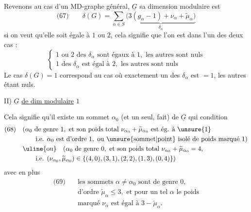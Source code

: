 Revenons au cas d'un MD-graphe général, $\underline G$ sa dimension modulaire est
\[
\text{(67)}\qquad\delta(G)=\sum_{\alpha\in S}\underbrace{\bigl(3(g_\alpha-1)+\nu_\alpha+\widetilde\mu_\alpha\bigr)}_{\delta_\alpha}
\]
si on veut qu'elle soit égale à $1$ ou $2$, cela signifie que l'on est dans l'un des deux cas :
\[
\left\{\begin{array}{l}
1\text{ ou }2\text{ des }\delta_\alpha\text{ sont égaux à }1,\text{ les autres sont nuls}\\
1\text{ des }\delta_\alpha\text{ est égal à }2,\text{ les autres sont nuls}
\end{array}\right.
\]
Le cas $\delta(G)=1$ correspond au cas où exactement un des $\delta_\alpha$ est $=1$, les autres étant nuls.

II) $\underline G$ \uline{de dim modulaire} $1$

Cela signifie qu'il existe un sommet $\alpha_0$ (et un seul,  fait) de $\underline G$ qui   condition
\[
\begin{aligned}
\text{(68)}\quad &(\alpha_0\text{ de genre }1,\text{ et son poids total }\nu_{\alpha_0}+\widetilde\mu_{\alpha_0}\text{ est ég. à }\unsure{1}\\
&\qquad\text{i.e. }\alpha_0\text{ est d'ordre }1,\text{ ou \unsure{sommet|point} isolé de poids marqué }1)\\
&\uline{\text{ou}}\quad(\alpha_0\text{ de genre }0,\text{ et son poids total }\nu_{\alpha_0}+\widetilde\mu_{\alpha_0}=4,\\
&\qquad\text{i.e. }(\nu_{\alpha_0},\widetilde\mu_{\alpha_0})\in\{(4,0),(3,1),(2,2),(1,3),(0,4)\})
\end{aligned}
\]
avec en plus
\[
\begin{aligned}
\text{(69)}\quad&\text{les sommets }\alpha\ne\alpha_0\text{ sont de genre }0,\\
&\text{d'ordre }\widetilde\mu_\alpha\leq3,\text{ et pour un tel }\alpha\text{ le poids}\\
&\text{marqué }\nu_\alpha\text{ est égal à }3-\widetilde\mu_\alpha.
\end{aligned}
\]
